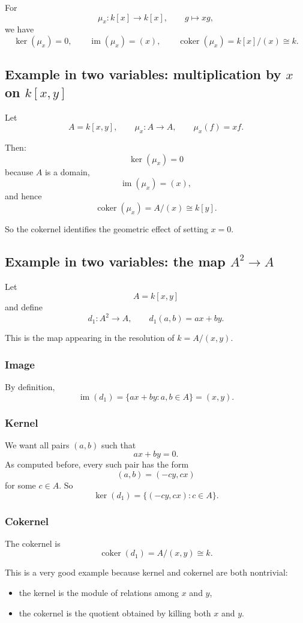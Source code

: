 \documentclass[12pt,a4paper]{article}
\theoremstyle{notespace}
\theoremstyle{definition}
\begin{document}
For
\[
\mu_x:k[x]\to k[x],
\qquad
g\mapsto xg,
\]
we have
\[
\ker(\mu_x)=0,
\qquad
\operatorname{im}(\mu_x)=(x),
\qquad
\operatorname{coker}(\mu_x)=k[x]/(x)\cong k.
\]

\subsection{ Example in two variables: multiplication by \(x\) on \(k[x,y]\)}

Let
\[
A=k[x,y],
\qquad
\mu_x:A\to A,
\qquad
\mu_x(f)=xf.
\]

Then:
\[
\ker(\mu_x)=0
\]
because \(A\) is a domain,
\[
\operatorname{im}(\mu_x)=(x),
\]
and hence
\[
\operatorname{coker}(\mu_x)=A/(x)\cong k[y].
\]

So the cokernel identifies the geometric effect of setting \(x=0\).

\subsection{ Example in two variables: the map \(A^2\to A\)}

Let
\[
A=k[x,y]
\]
and define
\[
d_1:A^2\longrightarrow A,
\qquad
d_1(a,b)=ax+by.
\]

This is the map appearing in the resolution of \(k=A/(x,y)\).

\subsubsection*{Image}

By definition,
\[
\operatorname{im}(d_1)=\{ax+by:a,b\in A\}=(x,y).
\]

\subsubsection*{Kernel}

We want all pairs \((a,b)\) such that
\[
ax+by=0.
\]
As computed before, every such pair has the form
\[
(a,b)=(-cy,cx)
\]
for some \(c\in A\).
So
\[
\ker(d_1)=\{(-cy,cx):c\in A\}.
\]

\subsubsection*{Cokernel}

The cokernel is
\[
\operatorname{coker}(d_1)=A/(x,y)\cong k.
\]

This is a very good example because kernel and cokernel are both nontrivial:
\begin{itemize}
	\item the kernel is the module of relations among \(x\) and \(y\),
	\item the cokernel is the quotient obtained by killing both \(x\) and \(y\).
\end{itemize}
\end{document}
